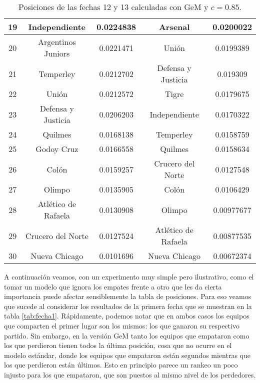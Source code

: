 \begin{table}[H]
\begin{flushright}
\begin{tabular}{| c | c | c || c | c |}
		19 & Independiente & 0.0224838 & Arsenal & 0.0200022 \\ \hline
		20 & Argentinos Juniors & 0.0221471 & Unión & 0.0199389 \\ \hline
		21 & Temperley & 0.0212702 & Defensa y Justicia & 0.019309 \\ \hline
		22 & Unión & 0.0212572 & Tigre & 0.0179675 \\ \hline
		23 & Defensa y Justicia & 0.0206203 & Independiente & 0.0170322 \\ \hline
		24 & Quilmes & 0.0168138 & Temperley & 0.0158759 \\ \hline
		25 & Godoy Cruz & 0.0166558 & Quilmes & 0.0158634 \\ \hline
		26 & Colón & 0.0159257 & Crucero del Norte & 0.0127548 \\ \hline
		27 & Olimpo & 0.0135905 & Colón & 0.0106429 \\ \hline
		28 & Atlético de Rafaela & 0.0130908 & Olimpo & 0.00977677 \\ \hline
		29 & Crucero del Norte & 0.0127524 & Atlético de Rafaela & 0.00877535 \\ \hline
		30 & Nueva Chicago & 0.0101696 & Nueva Chicago & 0.00672374 \\ \hline
	\end{tabular}
	\end{flushright}
	\caption{\footnotesize Posiciones de las fechas 12 y 13 calculadas con GeM y $c = 0.85$.}
	\label{tab:fecha12-13}
\end{table}

A continuación veamos, con un experimento muy simple pero ilustrativo, como el tomar un modelo que ignora los empates frente a otro que les da cierta importancia puede afectar sensiblemente la tabla de posiciones. Para eso veamos que sucede al considerar los resultados de la primera fecha que se muestran en la tabla \ref{tab:fecha1}. Rápidamente, podemos notar que en ambos casos los equipos que comparten el primer lugar son los mismos: los que ganaron su respectivo partido. Sin embargo, en la versión GeM tanto los equipos que empataron como los que perdieron tienen todos la última posición, cosa que no ocurre en el modelo estándar, donde los equipos que empataron están segundos mientras que los que perdieron están últimos. Esto en principio parece un rankeo un poco injusto para los que empataron, que son puestos al mismo nivel de los perdedores.

